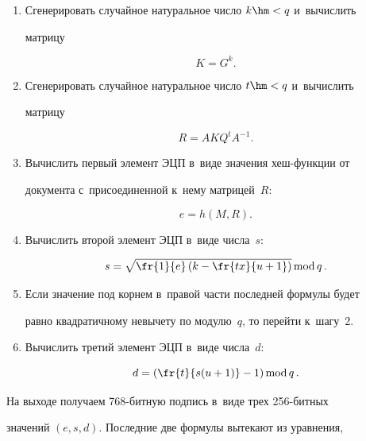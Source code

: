    \begin{enumerate}[1.]


   \item Сгенерировать случайное натуральное число $k\hm<q$ и~вычислить  


мат\-ри\-цу 


$$K= G^k.


$$


   \item Сгенерировать случайное натуральное число $t\hm <q$ и~вычислить 


матрицу 


$$


R= AKQ^t A^{-1}.


$$


   \item Вычислить первый элемент ЭЦП в~виде значения хеш-функ\-ции от 


документа с~присоединенной к~нему мат\-ри\-цей~$R$: 


$$ 


e=h(M,R).


$$ 


   \item Вычислить второй элемент ЭЦП в~виде числа~$s$: 


   $$


   s=\sqrt{\fr{1}{e}\left( k-\fr{tx}{u+1}\right)}\,\mathrm{mod}\, q\,.


   $$


   \item Если значение под корнем в~правой части последней формулы будет 


равно квадратичному невычету по модулю~$q$, то перейти к~шагу~2.


   \item Вычислить третий элемент ЭЦП в~виде числа~$d$: 


   $$


   d=\left( \fr{t}{s(u+1)}-1\right)\mathrm{mod}\,q\,.


   $$


   \end{enumerate}


   





   


   На выходе получаем 768-бит\-ную подпись в~виде трех 256-бит\-ных 


значений $(e,s,d)$. Последние две формулы вытекают из уравнения, 


